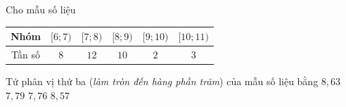 \begin{ex}%
Cho mẫu số liệu
\begin{center}
\begin{tabular}{|c|c|c|c|c|c|}
\hline
Nhóm& $[6;7)$ & $[7;8)$ & $[8;9)$ & $[9;10)$ & $[10;11)$ \\
\hline
Tần số& $8$ & $12$ & $10$ & $2$ & $3$ \\
\hline
\end{tabular}
\end{center}
Tứ phân vị thứ ba (\textit{làm tròn đến hàng phần trăm}) của mẫu số liệu bằng
\choice
{\True $8{,}63$}
{$7{,}79$}
{$7{,}76$}
{$8{,}57$}
\loigiai{
Ta có $n=35\Rightarrow \dfrac{3\cdot n}{4}=\dfrac{3\cdot 35}{4}=26{,}25\Rightarrow Q_3\in [8;9)$.\\
Khi đó $Q_3=8+\dfrac{26{,}25-(8+12)}{10}\cdot 1=8{,}625\approx 8{,}63$.
}
\end{ex}



